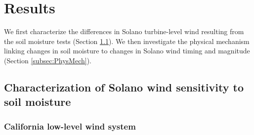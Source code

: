 
%
%
%
%
%

\section{Results}
\label{sec:solano_results}

We first characterize the differences in Solano turbine-level wind resulting from the soil moisture tests (Section \ref{subsec:CharWindChanges}).  We then investigate the physical mechanism linking changes in soil moisture to changes in Solano wind timing and magnitude (Section \ref{subsec:PhysMech}).

\subsection{Characterization of Solano wind sensitivity to soil moisture}
\label{subsec:CharWindChanges}

\subsubsection{California low-level wind system}
\label{subsubsec:control_winds}


